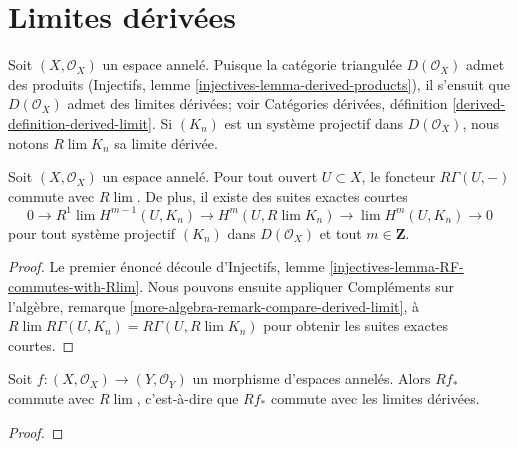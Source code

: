 {\section{Limites dérivées}

\label{section-derived-limits}

\noindent
Soit $(X, \mathcal{O}_X)$ un espace annelé. Puisque la catégorie triangulée $D(\mathcal{O}_X)$ admet des produits (Injectifs, lemme \ref{injectives-lemma-derived-products}), il s'ensuit que $D(\mathcal{O}_X)$ admet des limites dérivées; voir Catégories dérivées, définition \ref{derived-definition-derived-limit}. Si $(K_n)$ est un système projectif dans $D(\mathcal{O}_X)$, nous notons $R\lim K_n$ sa limite dérivée.

\begin{lemma}

\label{lemma-RGamma-commutes-with-Rlim}
Soit $(X, \mathcal{O}_X)$ un espace annelé. Pour tout ouvert $U \subset X$, le foncteur $R\Gamma(U, -)$ commute avec $R\lim$. De plus, il existe des suites exactes courtes $$
0 \to
R^1\lim H^{m - 1}(U, K_n) \to H^m(U, R\lim K_n) \to
\lim H^m(U, K_n) \to 0
$$ pour tout système projectif $(K_n)$ dans $D(\mathcal{O}_X)$ et tout $m \in \mathbf{Z}$.
\end{lemma}

\begin{proof}

Le premier énoncé découle d'Injectifs, lemme \ref{injectives-lemma-RF-commutes-with-Rlim}. Nous pouvons ensuite appliquer Compléments sur l'algèbre, remarque \ref{more-algebra-remark-compare-derived-limit},
à $R\lim R\Gamma(U, K_n) = R\Gamma(U, R\lim K_n)$ pour obtenir les suites exactes courtes.

\end{proof}

\begin{lemma}

\label{lemma-Rf-commutes-with-Rlim}

Soit $f : (X, \mathcal{O}_X) \to (Y, \mathcal{O}_Y)$ un morphisme d'espaces annelés. Alors $Rf_*$ commute avec $R\lim$, c'est-à-dire que $Rf_*$ commute avec les limites dérivées.

\end{lemma}

\begin{proof}


\end{proof}}
